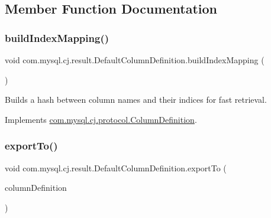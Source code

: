 \subsection{Member Function Documentation}
\mbox{\label{classcom_1_1mysql_1_1cj_1_1result_1_1_default_column_definition_a765750a709687a3a53d1fe1fa9891c96}} 
\subsubsection{\texorpdfstring{build\+Index\+Mapping()}{buildIndexMapping()}}
{\footnotesize\ttfamily void com.\+mysql.\+cj.\+result.\+Default\+Column\+Definition.\+build\+Index\+Mapping (\begin{DoxyParamCaption}{ }\end{DoxyParamCaption})}

Builds a hash between column names and their indices for fast retrieval. 

Implements \mbox{\hyperlink{interfacecom_1_1mysql_1_1cj_1_1protocol_1_1_column_definition_abadc6af9b7111fa0398649fe01a43308}{com.\+mysql.\+cj.\+protocol.\+Column\+Definition}}.

\mbox{\label{classcom_1_1mysql_1_1cj_1_1result_1_1_default_column_definition_a9997f7a2813bccae2ad368156b7b3cbc}} 
\subsubsection{\texorpdfstring{export\+To()}{exportTo()}}
{\footnotesize\ttfamily void com.\+mysql.\+cj.\+result.\+Default\+Column\+Definition.\+export\+To (\begin{DoxyParamCaption}\item[{\mbox{\hyperlink{interfacecom_1_1mysql_1_1cj_1_1protocol_1_1_column_definition}{Column\+Definition}}}]{column\+Definition }\end{DoxyParamCaption})}



